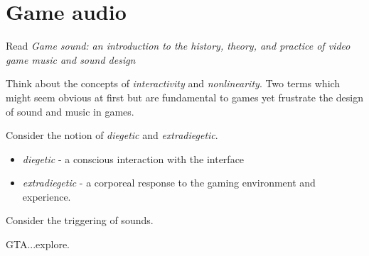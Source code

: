 
\chapter{Game audio}
\label{games}


Read \textit{Game sound: an introduction to the history, theory, and practice of video game music and sound design} \citeyearpar{collins2008game}

Think about the concepts of \textit{interactivity} and \textit{nonlinearity}. Two terms which might seem obvious at first but are fundamental to games yet frustrate the design of sound and music in games. 

Consider the notion of \textit{diegetic} and \textit{extradiegetic}. 
\begin{itemize}
\item \textit{diegetic} - a conscious interaction with the interface
\item \textit{extradiegetic} - a corporeal response to the gaming environment and experience. 
\end{itemize}

Consider the triggering of sounds. 

GTA...explore.

